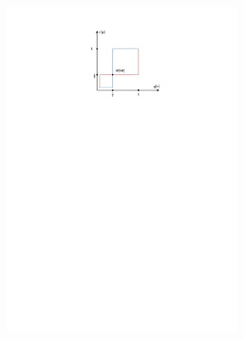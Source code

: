 \begin{figure}[H]
    \centering
    \includegraphics[width = 0.6\textwidth, trim = {4cm, 21cm, 3cm, 2cm}, clip]{document/0423.pdf}
\end{figure}

